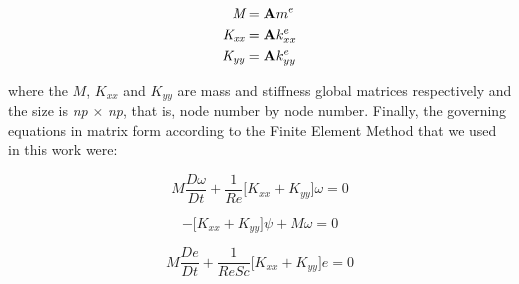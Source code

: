 \begin{align}
  \textit{M} & = \textbf{A} m^{e}\\
  \textit{K\textsubscript{xx}} & = \textbf{A} k_{xx}^{e} \\
  \textit{K\textsubscript{yy}} & = \textbf{A} k_{yy}^{e}
\end{align}


\medskip
\noindent
where the
$M$,
$K_{xx}$ and
$K_{yy}$
are mass and stiffness global matrices respectively and
the size is \textit{np} $\times$ \textit{np}, that is,
node number by node number. 
Finally, the governing equations in matrix form according to 
the Finite Element Method that we used in this work were:


\begin{equation}
 M \frac{D \omega}{Dt} 
 + \frac{1}{\textit{Re}} \Big[ K_{xx} + K_{yy} \Big] \omega
 = 0 \label{vorticity matrix}
\end{equation}

\begin{equation}
 - \Big[ K_{xx} + K_{yy} \Big] \psi + M \omega = 0 \label{stream matrix}
\end{equation}

\begin{equation}
 M \frac{De}{Dt} 
 + \frac{1}{\textit{ReSc}} \Big[ K_{xx} + K_{yy} \Big] e
 = 0 \label{concentration matrix}
\end{equation}



